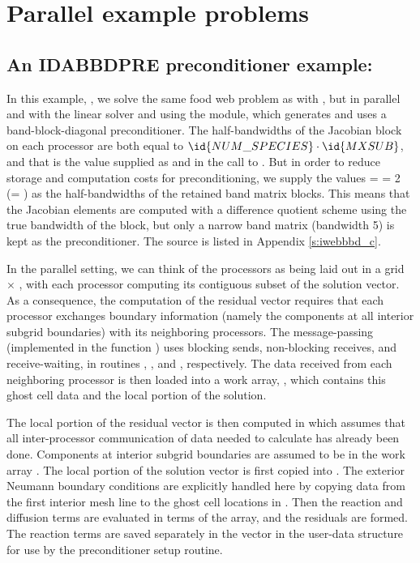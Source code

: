 \section{Parallel example problems}\label{s:ex_parallel}

\subsection{An IDABBDPRE preconditioner example: }\label{ss:iwebbbd}

In this example, , we solve the same food web problem as with
, but in parallel and with the {\idaspgmr} linear solver and
using the {\idabbdpre} module, which generates and uses a band-block-diagonal 
preconditioner.  
The half-bandwidths of the Jacobian block on each processor are both equal to
$\id{NUM\_SPECIES}\cdot\id{MXSUB}$, and that is the value supplied as  and 
in the call to .  But in order to reduce storage and computation
costs for preconditioning, we supply the values  =  = 2
(= ) as the half-bandwidths of the retained band matrix blocks.
This means that the Jacobian elements are computed with a difference quotient
scheme using the true bandwidth of the block, but only a narrow band matrix
(bandwidth 5) is kept as the preconditioner.  The source is listed in
Appendix \ref{s:iwebbbd_c}. 

In the parallel setting, we can think of the processors as being laid out
in a grid  $\times$ , with each processor computing its
contiguous subset of the solution vector. As a consequence, the computation 
of the residual vector requires that each processor exchanges boundary information
(namely the components at all interior subgrid boundaries) with its neighboring processors.
The message-passing (implemented in the function ) uses blocking sends, 
non-blocking receives, and receive-waiting, in routines , ,
and , respectively.
The data received from each neighboring processor is then loaded into a work array,
, which contains this ghost cell data and the local portion of the solution.

The local portion of the residual vector is then computed in  which
assumes that all inter-processor communication of data
needed to calculate  has already been done.  Components at interior
subgrid boundaries are assumed to be in the work array .
The local portion of the solution vector  is first copied into .
The exterior Neumann boundary conditions are explicitly handled here
by copying data from the first interior mesh line to the ghost cell
locations in .  Then the reaction and diffusion terms are
evaluated in terms of the  array, and the residuals are formed.
The reaction terms are saved separately in the vector  in the user-data
structure  for use by the preconditioner setup routine. 

